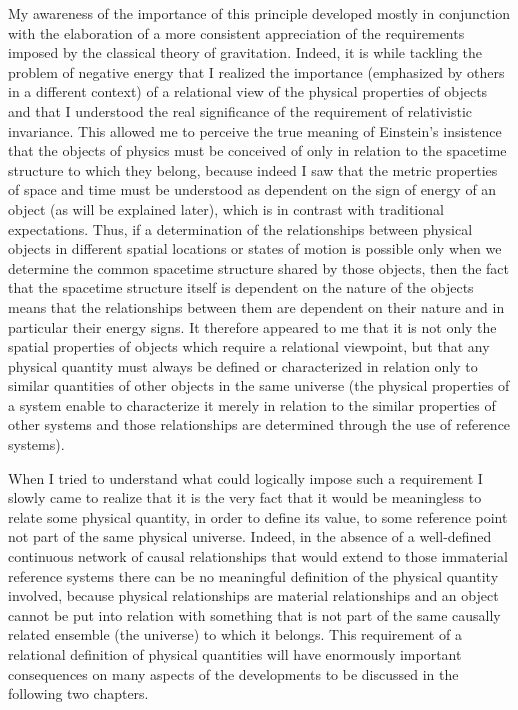 \documentclass[notitlepage,12pt]{report}
\begin{document}
My awareness of the importance of this principle developed mostly in conjunction with the elaboration of a more consistent appreciation of the requirements imposed by the classical theory of gravitation. Indeed, it is while tackling the problem of negative energy that I realized the importance (emphasized by others in a different context) of a relational view of the physical properties of objects and that I understood the real significance of the requirement of relativistic invariance. This allowed me to perceive the true meaning of Einstein's insistence that the objects of physics must be conceived of only in relation to the spacetime structure to which they belong, because indeed I saw that the metric properties of space and time must be understood as dependent on the sign of energy of an object (as will be explained later), which is in contrast with traditional expectations. Thus, if a determination of the relationships between physical objects in different spatial locations or states of motion is possible only when we determine the common spacetime structure shared by those objects, then the fact that the spacetime structure itself is dependent on the nature of the objects means that the relationships between them are dependent on their nature and in particular their energy signs. It therefore appeared to me that it is not only the spatial properties of objects which require a relational viewpoint, but that any physical quantity must always be defined or characterized in relation only to similar quantities of other objects in the same universe (the physical properties of a system enable to characterize it merely in relation to the similar properties of other systems and those relationships are determined through the use of reference systems).

When I tried to understand what could logically impose such a requirement I slowly came to realize that it is the very fact that it would be meaningless to relate some physical quantity, in order to define its value, to some reference point not part of the same physical universe. Indeed, in the absence of a well-defined continuous network of causal relationships that would extend to those immaterial reference systems there can be no meaningful definition of the physical quantity involved, because physical relationships are material relationships and an object cannot be put into relation with something that is not part of the same causally related ensemble (the universe) to which it belongs. This requirement of a relational definition of physical quantities will have enormously important consequences on many aspects of the developments to be discussed in the following two chapters.
\end{document}

